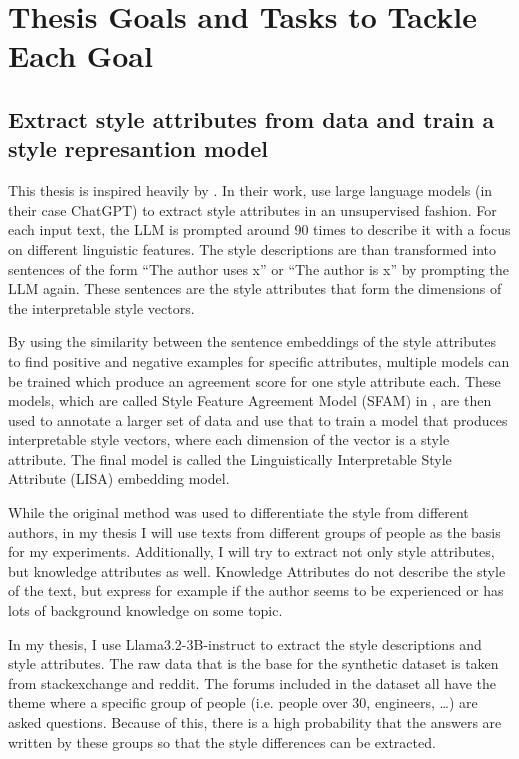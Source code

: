 
\section{Thesis Goals and Tasks to Tackle Each Goal}
  \subsection{Extract style attributes from data and train a style represantion model}
  This thesis is inspired heavily by \citet{patelLearningInterpretableStyle2023}. In their work, \citeauthor{patelLearningInterpretableStyle2023} use large language models (in their case ChatGPT) to extract style attributes in an unsupervised fashion. For each input text, the LLM is prompted around 90 times to describe it with a focus on different linguistic features. The style descriptions are than transformed into sentences of the form \enquote{The author uses x} or \enquote{The author is x} by prompting the LLM again. These sentences are the style attributes that form the dimensions of the interpretable style vectors.

  By using the similarity between the sentence embeddings of the style attributes to find positive and negative examples for specific attributes, multiple models can be trained which produce an agreement score for one style attribute each. These models, which are called Style Feature Agreement Model (SFAM) in \citet{patelLearningInterpretableStyle2023}, are then used to annotate a larger set of data and use that to train a model that produces interpretable style vectors, where each dimension of the vector is a style attribute. The final model is called the Linguistically Interpretable Style Attribute (LISA) embedding model.
  
  While the original method was used to differentiate the style from different authors, in my thesis I will use texts from different groups of people as the basis for my experiments. Additionally, I will try to extract not only style attributes, but knowledge attributes as well. Knowledge Attributes do not describe the style of the text, but express for example if the author seems to be experienced or has lots of background knowledge on some topic.
  
  In my thesis, I use Llama3.2-3B-instruct %
  to extract the style descriptions and style attributes. The raw data that is the base for the synthetic dataset is taken from stackexchange and reddit. The forums included in the dataset all have the theme where a specific group of people (i.e. people over 30, engineers, \ldots) are asked questions. Because of this, there is a high probability that the answers are written by these groups so that the style differences can be extracted.

